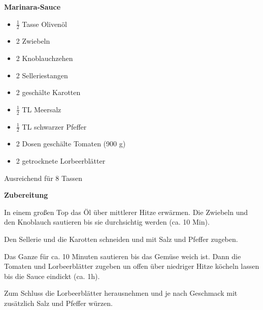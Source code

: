 

\parindent0pt	

\pagestyle{empty}


\textbf{{\LARGE Marinara-Sauce}}%

\hrulefill
\vspace*{\fill}
\begin{multicols}{2}	


\begin{itemize}
\item $\frac{1}{2}$ Tasse Olivenöl
\item 2 Zwiebeln
\item 2 Knoblauchzehen
\item 2 Selleriestangen
\item 2 geschälte Karotten
\item $\frac{1}{2}$ TL Meersalz
\item $\frac{1}{2}$ TL schwarzer Pfeffer
\item 2 Dosen geschälte Tomaten (900 g)
\item 2 getrocknete Lorbeerblätter
\end{itemize}
\end{multicols}
\vfill									%


\begin{center}			%
Ausreichend für 8 Tassen
\end{center}

\vfill
\newpage
\textbf{{\LARGE Zubereitung}}%

\hrulefill

\vspace*{\fill}
\begin{multicols}{2}

In einem großen Top das Öl über mittlerer Hitze erwärmen.
Die Zwiebeln und den Knoblauch sautieren bis sie durchsichtig werden (ca. 10 Min).\newline

Den Sellerie und die Karotten schneiden und mit Salz und Pfeffer
zugeben.\newline

Das Ganze für ca. 10 Minuten sautieren bis das Gemüse weich ist.
Dann die Tomaten und Lorbeerblätter zugeben un offen über niedriger
Hitze köcheln lassen bis die Sauce eindickt (ca. 1h).\newline

Zum Schluss die Lorbeerblätter herausnehmen und je nach
Geschmack mit zusätzlich Salz und Pfeffer würzen.

\end{multicols}
\vfill
